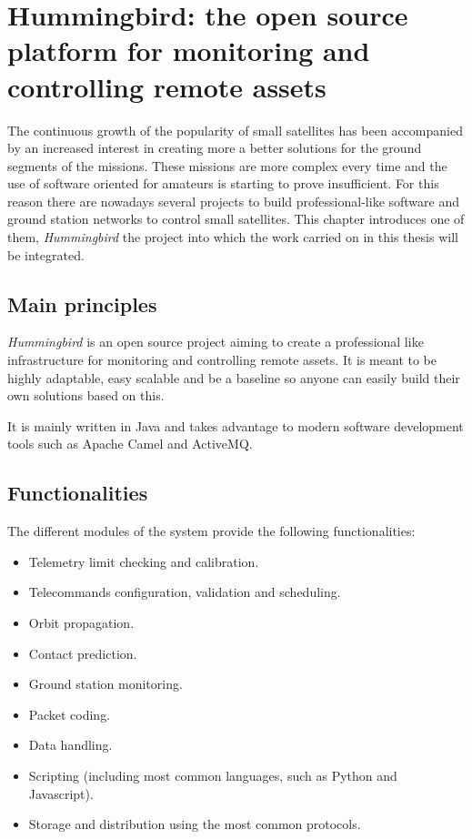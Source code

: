 
\chapter{Hummingbird: the open source platform for monitoring and controlling remote assets}\label{chapter3}

The continuous growth of the popularity of small satellites has been accompanied by an increased interest in creating more a better solutions for the ground segments of the missions. These missions are more complex every time and the use of software oriented for amateurs is starting to prove insufficient. For this reason there are nowadays several projects to build professional-like software and ground station networks to control small satellites. This chapter introduces one of them, \emph{Hummingbird}\citep{HBird} the project into which the work carried on in this thesis will be integrated. 

\section{Main principles} 

\emph{Hummingbird} is an open source project aiming to create a professional like infrastructure for monitoring and controlling remote assets. It is meant to be highly adaptable, easy scalable and be a baseline so anyone can easily build their own solutions based on this. 

It is mainly written in Java\cite{Java} and takes advantage to modern software development tools such as Apache Camel\cite{Camel} and ActiveMQ\cite{AMQ}. 
\pagebreak
\section{Functionalities}

The different modules of the system provide the following functionalities:\cite{Elo}

\begin{itemize}
\item Telemetry limit checking and calibration.
\item Telecommands configuration, validation and scheduling.
\item Orbit propagation.
\item Contact prediction.
\item Ground station monitoring.
\item Packet coding.
\item Data handling.
\item Scripting (including most common languages, such as Python and Javascript).
\item Storage and distribution using the most common protocols.

\end{itemize}



